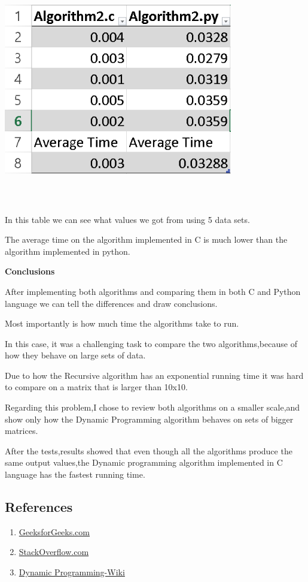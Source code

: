 \documentclass{article}
\begin{document}
\begin{enumerate}
\includegraphics[width=10cm, height=10cm]{tablealg2}
\par In this table we can see what values we got from using 5 data sets.
\par The average time on the algorithm implemented in C is much lower than
the algorithm implemented in python.
\\
\par \textbf{Conclusions}
\par After implementing both algorithms and comparing them in both C and Python language we can tell the differences and draw conclusions.
\par Most importantly is how much time the algorithms take to run.
\newpage
\par In this case, it was a challenging task to compare the two algorithms,because of how they behave on large sets of data.

\par Due to how the Recursive algorithm has an exponential running time 
it was hard to compare on a matrix that is larger than 10x10.
\par Regarding this problem,I chose to review both algorithms on a smaller scale,and show only how the Dynamic Programming algorithm behaves on sets of bigger matrices.
\par After the tests,results showed that even though all the algorithms produce the same output values,the Dynamic programming algorithm implemented in C language has the fastest running time.
\subsection {References}
\begin{enumerate}
\item \href{https://www.geeksforgeeks.org/}{GeeksforGeeks.com}
\item \href{https://stackoverflow.com/}{StackOverflow.com}
\item \href{https://en.wikipedia.org/wiki/Dynamic_programming/}{Dynamic Programming-Wiki}
\end{enumerate}
\end{enumerate}
\end{document}
